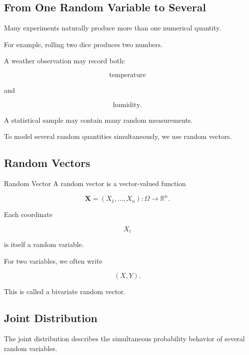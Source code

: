 \subsection{From One Random Variable to Several}
\label{subsec:from-one-rv-to-several}

Many experiments naturally produce more than one numerical quantity.

For example, rolling two dice produces two numbers.

A weather observation may record both:

\[
\text{temperature}
\]

and

\[
\text{humidity}.
\]

A statistical sample may contain many random measurements.

To model several random quantities simultaneously, we use random
vectors.

\subsection{Random Vectors}
\label{subsec:random-vectors}

\begin{definitionbox}{Random Vector}
A random vector is a vector-valued function

\[
\boxed{
\mathbf{X}
=
(X_1,\ldots,X_n):
\Omega\to\mathbb{R}^n.
}
\]
\end{definitionbox}

Each coordinate

\[
X_i
\]

is itself a random variable.

For two variables, we often write

\[
\boxed{
(X,Y).
}
\]

This is called a bivariate random vector.

\subsection{Joint Distribution}
\label{subsec:joint-distribution-definition}

The joint distribution describes the simultaneous probability behavior
of several random variables.

